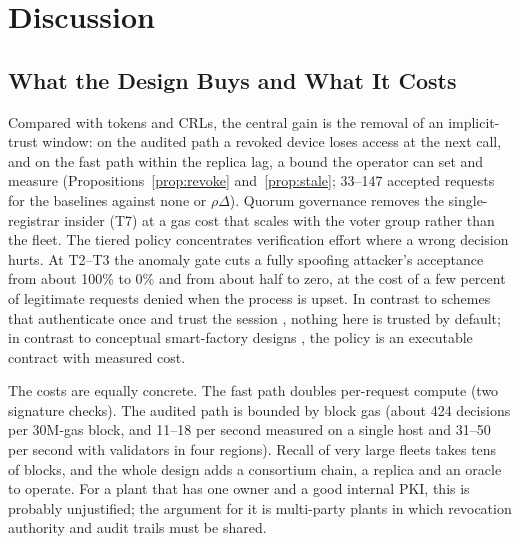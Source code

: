 \section{Discussion}\label{sec:disc}

\subsection{What the Design Buys and What It Costs}
Compared with tokens and CRLs, the central gain is the removal of an implicit-trust window: on the audited path a revoked device loses access at the next call, and on the fast path within the replica lag, a bound the operator can set and measure (Propositions~\ref{prop:revoke} and~\ref{prop:stale}; 33--147 accepted requests for the baselines against none or $\rho\Delta$). Quorum governance removes the single-registrar insider (T7) at a gas cost that scales with the voter group rather than the fleet. The tiered policy concentrates verification effort where a wrong decision hurts. At T2--T3 the anomaly gate cuts a fully spoofing attacker's acceptance from about 100\% to 0\% and from about half to zero, at the cost of a few percent of legitimate requests denied when the process is upset. In contrast to schemes that authenticate once and trust the session \cite{wang2026medicaliot}, nothing here is trusted by default; in contrast to conceptual smart-factory designs \cite{farhan2026ztfsf}, the policy is an executable contract with measured cost.

The costs are equally concrete. The fast path doubles per-request compute (two signature checks). The audited path is bounded by block gas (about 424 decisions per 30M-gas block, and 11--18 per second measured on a single host and 31--50 per second with validators in four regions). Recall of very large fleets takes tens of blocks, and the whole design adds a consortium chain, a replica and an oracle to operate. For a plant that has one owner and a good internal PKI, this is probably unjustified; the argument for it is multi-party plants in which revocation authority and audit trails must be shared.

